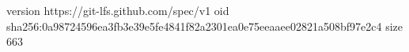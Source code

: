 version https://git-lfs.github.com/spec/v1
oid sha256:0a98724596ea3fb3e39e5fe4841f82a2301ea0e75eeaaee02821a508bf97e2c4
size 663
